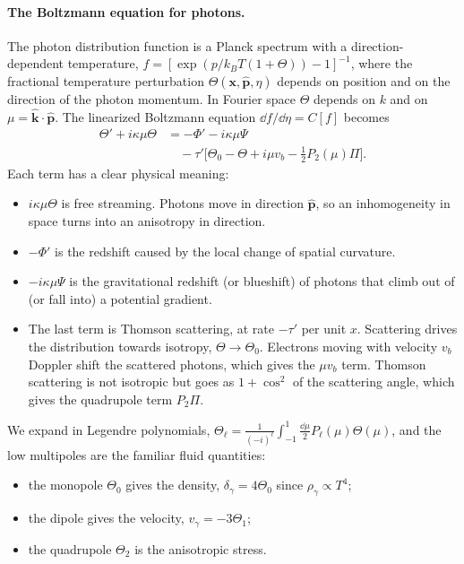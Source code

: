 \paragraph*{The Boltzmann equation for photons.} The photon distribution function is a Planck spectrum with a
direction-dependent temperature, $f=[\exp(p/k_BT(1+\Theta))-1]^{-1}$, where the fractional temperature perturbation
$\Theta(\bm{x},\hat{\bm p},\eta)$ depends on position and on the direction of the photon momentum. In Fourier space
$\Theta$ depends on $k$ and on $\mu=\hat{\bm k}\cdot\hat{\bm p}$. The linearized Boltzmann equation
$\dd f/\dd\eta=C[f]$ becomes
\begin{align}
\Theta' + i\kappa\mu\Theta &= -\Phi' - i\kappa\mu\Psi \nonumber\\
 &\quad - \tau'\Big[\Theta_0 - \Theta + i\mu v_b - \tfrac12P_2(\mu)\Pi\Big].
\label{eq:boltz_photon}
\end{align}
Each term has a clear physical meaning:
\begin{itemize}
\item $i\kappa\mu\Theta$ is free streaming. Photons move in direction $\hat{\bm p}$, so an inhomogeneity in space turns
      into an anisotropy in direction.
\item $-\Phi'$ is the redshift caused by the local change of spatial curvature.
\item $-i\kappa\mu\Psi$ is the gravitational redshift (or blueshift) of photons that climb out of (or fall into) a
      potential gradient.
\item The last term is Thomson scattering, at rate $-\tau'$ per unit $x$. Scattering drives the distribution towards
      isotropy, $\Theta\to\Theta_0$. Electrons moving with velocity $v_b$ Doppler shift the scattered photons, which
      gives the $\mu v_b$ term. Thomson scattering is not isotropic but goes as $1+\cos^2$ of the scattering angle, which
      gives the quadrupole term $P_2\Pi$.
\end{itemize}
We expand in Legendre polynomials,
$\Theta_\ell=\frac{1}{(-i)^\ell}\int_{-1}^1\frac{\dd\mu}{2}P_\ell(\mu)\Theta(\mu)$, and the low multipoles are the familiar
fluid quantities:
\begin{itemize}
\item the monopole $\Theta_0$ gives the density, $\delta_\gamma=4\Theta_0$ since $\rho_\gamma\propto T^4$;
\item the dipole gives the velocity, $v_\gamma=-3\Theta_1$;
\item the quadrupole $\Theta_2$ is the anisotropic stress.
\end{itemize}
